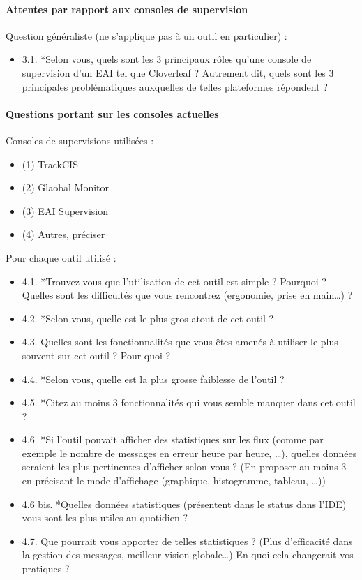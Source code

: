 	\paragraph{Attentes par rapport aux consoles de supervision}
	Question généraliste (ne s’applique pas à un outil en particulier) :
	\begin{itemize}
	  \item 3.1. *Selon vous, quels sont les 3 principaux rôles qu’une console de
	  supervision d’un EAI tel que Cloverleaf ? Autrement dit, quels sont les 3
	  principales problématiques auxquelles de telles plateformes répondent ?
	\end{itemize}
	
	\paragraph{Questions portant sur les consoles actuelles}
	Consoles de supervisions utilisées :
	\begin{itemize}
	  \item (1) TrackCIS
	  \item (2) Glaobal Monitor
	  \item (3) EAI Supervision
	  \item (4) Autres, préciser
	\end{itemize}
	Pour chaque outil utilisé :
	\begin{itemize}
	  \item 4.1. *Trouvez-vous que l’utilisation de cet outil est simple ? Pourquoi
	  ? Quelles sont les difficultés que vous rencontrez (ergonomie, prise en main…) ?
	  \item 4.2. *Selon vous, quelle est le plus gros atout de cet outil ?
	  \item 4.3. Quelles sont les fonctionnalités que vous êtes amenés à utiliser le
	  plus souvent sur cet outil ? Pour quoi ?
	  \item 4.4. *Selon vous, quelle est la plus grosse faiblesse de l’outil ?
	  \item 4.5. *Citez au moins 3 fonctionnalités qui vous semble manquer dans cet
	  outil ?
	  \item 4.6. *Si l’outil pouvait afficher des statistiques sur les flux (comme
	  par exemple le nombre de messages en erreur heure par heure, …), quelles
	  données seraient les plus pertinentes d’afficher selon vous ? (En proposer au
	  moins 3 en précisant le mode d’affichage (graphique, histogramme, tableau,
	  …))
	  \item 4.6 bis. *Quelles données statistiques (présentent dans le status dans
	  l’IDE) vous sont les plus utiles au quotidien ?
	  \item 4.7. Que pourrait vous apporter de telles statistiques ? (Plus
	  d’efficacité dans la gestion des messages, meilleur vision globale…) En quoi
	  cela changerait vos pratiques ?
	\end{itemize}
	
